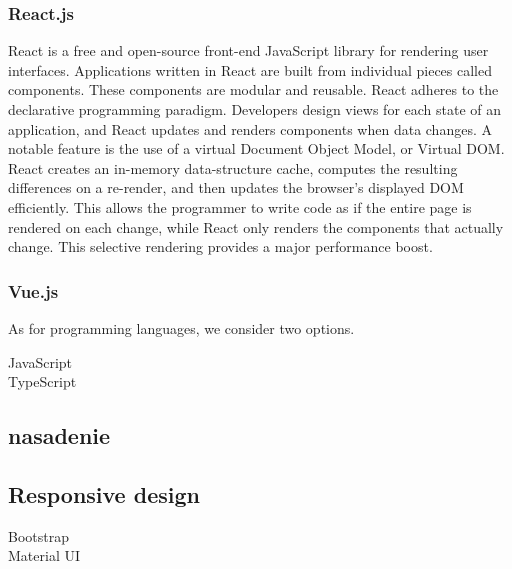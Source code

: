 \subsubsection*{React.js}
React is a free and open-source front-end JavaScript library for rendering user interfaces.
Applications written in React are built from individual pieces called components.
These components are modular and reusable.
React adheres to the declarative programming paradigm. 
Developers design views for each state of an application, and React updates and renders components when data changes.
A notable feature is the use of a virtual Document Object Model, or Virtual DOM. 
React creates an in-memory data-structure cache, computes the resulting differences on a re-render, and then updates the browser's displayed DOM efficiently. 
This allows the programmer to write code as if the entire page is rendered on each change, while React only renders the components that actually change. 
This selective rendering provides a major performance boost.

\subsubsection*{Vue.js}

As for programming languages, we consider two options. 

\begin{description}
  \item[JavaScript] 
  \item[TypeScript] 
\end{description}


\subsection{nasadenie}

\subsection{Responsive design}
\begin{description}
  \item[Bootstrap] 
  \item[Material UI] 
\end{description}

